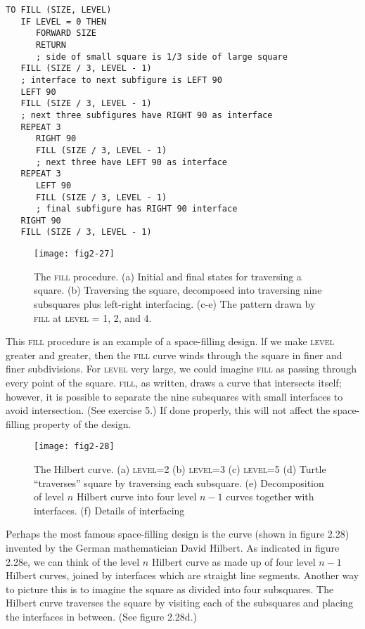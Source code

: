 \documentclass{book}
\begin{document}
\begin{verbatim}
TO FILL (SIZE, LEVEL)
   IF LEVEL = 0 THEN
      FORWARD SIZE
      RETURN
      ; side of small square is 1/3 side of large square
   FILL (SIZE / 3, LEVEL - 1)
   ; interface to next subfigure is LEFT 90
   LEFT 90
   FILL (SIZE / 3, LEVEL - 1)
   ; next three subfigures have RIGHT 90 as interface
   REPEAT 3
      RIGHT 90
      FILL (SIZE / 3, LEVEL - 1)
      ; next three have LEFT 90 as interface
   REPEAT 3
      LEFT 90
      FILL (SIZE / 3, LEVEL - 1)
      ; final subfigure has RIGHT 90 interface
   RIGHT 90
   FILL (SIZE / 3, LEVEL - 1)
\end{verbatim}
\begin{figure}
\begin{center}
\texttt{[image: fig2-27]}
\caption{The \textsc{fill} procedure. (a) Initial and final states for traversing a square. (b) Traversing the square, decomposed into traversing nine subsquares plus left-right interfacing. (c-e) The pattern drawn by \textsc{fill} at \textsc{level} = 1, 2, and 4.}
\end{center}
\end{figure}

This \textsc{fill} procedure is an example of a space-filling design. lf we
make \textsc{level} greater and greater, then the \textsc{fill} curve winds through the
square in finer and finer subdivisions. For \textsc{level} very large, we could
imagine \textsc{fill} as passing through every point of the square. \textsc{fill}, as
written, draws a curve that intersects itself; however, it is possible to
separate the nine subsquares with small interfaces to avoid intersection.
(See exercise 5.) If done properly, this will not affect the space-filling
property of the design.

\begin{figure}
\begin{center}
\texttt{[image: fig2-28]}
\caption{The Hilbert curve. (a) \textsc{level}=2 (b) \textsc{level}=3 (c) \textsc{level}=5 (d) Turtle ``traverses'' square by traversing each subsquare. (e) Decomposition of level $n$ Hilbert curve into four level $n - 1$ curves together with interfaces. (f) Details of interfacing}
\end{center}
\end{figure}

Perhaps the most famous space-filling design is the curve (shown in
figure 2.28) invented by the German mathematician David Hilbert. As
indicated in figure 2.28e, we can think of the level $n$ Hilbert curve as
made up of four level $n - 1$ Hilbert curves, joined by interfaces which
are straight line segments. Another way to picture this is to imagine the
square as divided into four subsquares. The Hilbert curve traverses the
square by visiting each of the subsquares and placing the interfaces in
between. (See figure 2.28d.)
\end{document}
